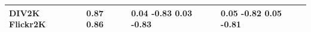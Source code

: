 \begin{tabular}{llll}
\toprule
DIV2K Flickr2K & 0.87 0.86 & 0.04 -0.83 0.03 -0.83 & 0.05 -0.82 0.05 -0.81 \\
\midrule
\bottomrule
\end{tabular}
